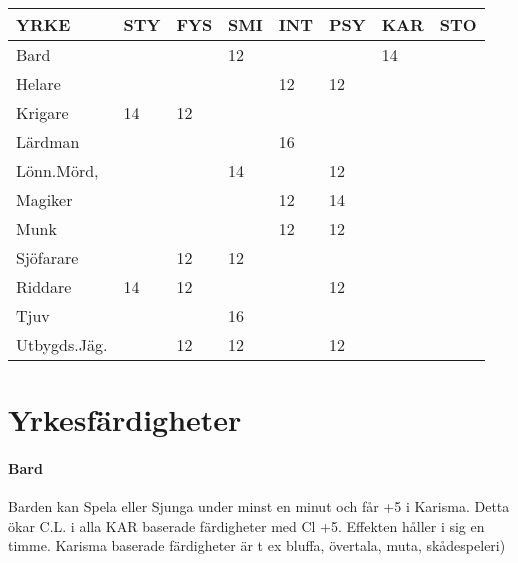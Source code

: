 \documentclass[a4paper, 10pt, titlepage]{article}
\begin{document}
\begin{table}[hbp]
  \begin{tabular}{|l|l|l|l|l|l|l|l|}
    \hline
    YRKE         & STY     & FYS      & SMI     & INT    & PSY     & KAR     & STO  \\
    \hline
    Bard         & ~      & ~         & 12      & ~      & ~       & 14      & ~   \\
    \hline
    Helare       & ~      & ~         & ~       & 12     & 12      & ~       & ~   \\
    \hline
    Krigare      & 14     & 12        & ~       & ~      & ~       & ~       & ~   \\
    \hline
    Lärdman      & ~      & ~         & ~       & 16     & ~       & ~       & ~   \\
    \hline
    Lönn.Mörd,   & ~      & ~         & 14      & ~      & 12      & ~       & ~   \\
    \hline
    Magiker      & ~      & ~         & ~       & 12     & 14      & ~       & ~   \\
    \hline
    Munk         & ~      & ~         & ~       & 12     & 12      & ~       & ~   \\
    \hline
    Sjöfarare    & ~      & 12        & 12      & ~      & ~       & ~       & ~   \\
    \hline
    Riddare      & 14     & 12        & ~       & ~      & 12      & ~       & ~   \\
    \hline
    Tjuv         & ~      & ~         & 16      & ~      & ~       & ~       & ~   \\
    \hline
    Utbygds.Jäg. & ~      & 12        & 12      & ~      & 12      & ~       & ~   \\
    \hline
  \end{tabular}
\end{table}

\newpage
\section{Yrkesfärdigheter}

\paragraph{Bard} Barden kan Spela eller Sjunga under minst en minut och får +5 i Karisma.
Detta ökar C.L. i alla KAR baserade färdigheter med Cl +5. Effekten håller i sig en timme.
Karisma baserade färdigheter är t ex bluffa, övertala, muta, skådespeleri)
\end{document}
